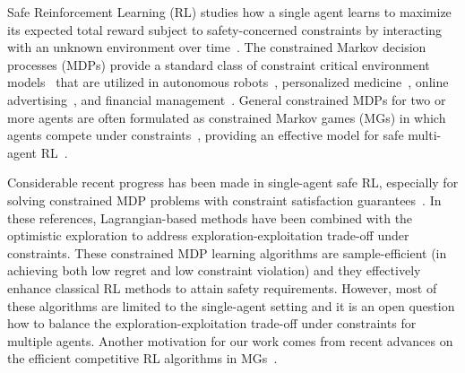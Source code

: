 \documentclass[12pt, final]{l4dc2023}
\begin{document}
Safe Reinforcement Learning (RL) studies how a single agent learns to maximize its expected total reward subject to safety-concerned constraints by interacting with an unknown environment over time~\citep{garcia2015comprehensive,thomas2015safe,amodei2016concrete}. The constrained Markov decision processes (MDPs) provide a standard class of constraint critical environment models~\citep{altman1999constrained} that are utilized in autonomous robots~\citep{feyzabadi2017robot,fisac2018general}, personalized medicine~\citep{girard2018structural}, online advertising~\citep{boutilier2016budget}, and financial management~\citep{abe2010optimizing}. General constrained MDPs for two or more agents are often formulated as constrained Markov games (MGs) in which agents compete under constraints~\citep{altman2000constrained,altman2005zero,altman2008constrained}, providing an effective model for safe multi-agent RL~\citep{nguyen2014decentralized,shalev2016safe,zhang2019multi}.

Considerable recent progress has been made in single-agent safe RL, especially for solving constrained MDP problems with constraint satisfaction guarantees~\citep{efroni2020exploration,brantley2020constrained,bai2020model,ding2020provably,chen2021primal,singh2020learning,ding2022convergence}. In these references, Lagrangian-based methods have been combined with the optimistic exploration to address exploration-exploitation trade-off under constraints. These constrained MDP learning algorithms are sample-efficient (in achieving both low regret and low constraint violation) and they effectively enhance classical RL methods to attain safety requirements. However, most of these algorithms are limited to the single-agent setting and it is an open question how to balance the exploration-exploitation trade-off under constraints for multiple agents. Another motivation for our work comes from recent advances on the efficient competitive RL algorithms in MGs~\citep{wei2017online,bai2020provable,bai2020near,xie2020learning}.
\end{document}
